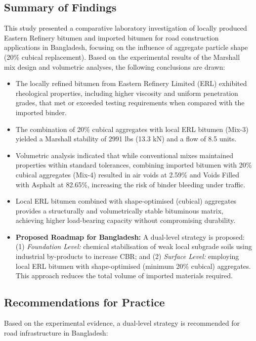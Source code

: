 \documentclass[12pt,a4paper]{article}
\begin{document}
\subsection{Summary of Findings}
This study presented a comparative laboratory investigation of locally produced Eastern Refinery bitumen and imported bitumen for road construction applications in Bangladesh, focusing on the influence of aggregate particle shape (20\% cubical replacement). Based on the experimental results of the Marshall mix design and volumetric analyses, the following conclusions are drawn:
\begin{itemize}
    \item The locally refined bitumen from Eastern Refinery Limited (ERL) exhibited rheological properties, including higher viscosity and uniform penetration grades, that met or exceeded testing requirements when compared with the imported binder.
    \item The combination of 20\% cubical aggregates with local ERL bitumen (Mix-3) yielded a Marshall stability of 2991 lbs (13.3 kN) and a flow of 8.5 units.
    \item Volumetric analysis indicated that while conventional mixes maintained properties within standard tolerances, combining imported bitumen with 20\% cubical aggregates (Mix-4) resulted in air voids at 2.59\% and Voids Filled with Asphalt at 82.65\%, increasing the risk of binder bleeding under traffic.
    \item Local ERL bitumen combined with shape-optimised (cubical) aggregates provides a structurally and volumetrically stable bituminous matrix, achieving higher load-bearing capacity without compromising durability.
    \item \textbf{Proposed Roadmap for Bangladesh:} A dual-level strategy is proposed: (1) \textit{Foundation Level:} chemical stabilisation of weak local subgrade soils using industrial by-products to increase CBR; and (2) \textit{Surface Level:} employing local ERL bitumen with shape-optimised (minimum 20\% cubical) aggregates. This approach reduces the total volume of imported materials required.
\end{itemize}

\subsection{Recommendations for Practice}
Based on the experimental evidence, a dual-level strategy is recommended for road infrastructure in Bangladesh:
\end{document}
